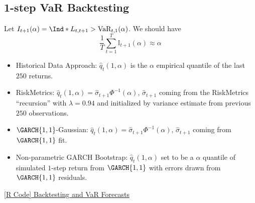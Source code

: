 \subsection*{1-step VaR Backtesting}
Let $ \mathbb{I}_{t+1}(\alpha)=\Ind*{L_{t,t+1}>\text{VaR}_{t,1}(\alpha)} $. We should
have
\[ \frac{1}{T} \sum_{t=1}^{T} \mathbb{I}_{t+1}(\alpha)\approx \alpha \]
\begin{itemize}
    \item Historical Data Approach: $ \hat{q}_t(1,\alpha) $ is the $ \alpha $
          empirical quantile of the last $ 250 $ returns.
    \item RiskMetrics: $ \hat{q}_t(1,\alpha)=\hat{\sigma}_{t+1}\Phi^{-1}(\alpha) $,
          $ \hat{\sigma}_{t+1} $ coming from the RiskMetrics ``recursion'' with $ \lambda=0.94 $
          and initialized by variance estimate from previous $ 250 $ observations.
    \item $ \GARCH{1,1} $-Gaussian: $ \hat{q}_{t}(1,\alpha)=\hat{\sigma}_{t+1}\Phi^{-1}(\alpha) $,
          $ \hat{\sigma}_{t+1} $ coming from $ \GARCH{1,1} $ fit.
    \item Non-parametric GARCH Bootstrap: $ \hat{q}_{t}(1,\alpha) $ set to be a
          $ \alpha $ quantile of simulated $ 1 $-step return from $ \GARCH{1,1} $
          with errors drawn from $ \GARCH{1,1} $ residuals.
\end{itemize}
\href{https://github.com/Hextical/university-notes/blob/master/year-3/semester-2/STAT%20443/code/10.3%20-%20Backtesting%20and%20VaR%20Forecasts.R}{[R Code] Backtesting and VaR Forecasts}
